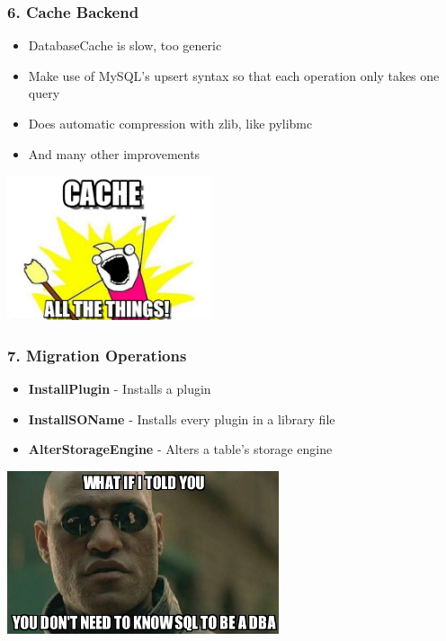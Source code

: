 \documentclass{beamer}
\begin{document}
\begin{frame}[fragile]\frametitle{6. Cache Backend}

    \begin{itemize}
        \item DatabaseCache is slow, too generic
        \item Make use of MySQL's upsert syntax so that each operation only takes one query
        \item Does automatic compression with zlib, like pylibmc
        \item And many other improvements
    \end{itemize}

    \begin{center}
        \includegraphics[width=6cm]{cache-all-the-things}
    \end{center}

\end{frame}



\begin{frame}[fragile]\frametitle{7. Migration Operations}

    \begin{itemize}
        \item \textbf{InstallPlugin} - Installs a plugin
        \item \textbf{InstallSOName} - Installs every plugin in a library file
        \item \textbf{AlterStorageEngine} - Alters a table's storage engine
    \end{itemize}

    \begin{center}
        \includegraphics[width=8cm]{what-if-i-told-you}
    \end{center}

\end{frame}
\end{document}
